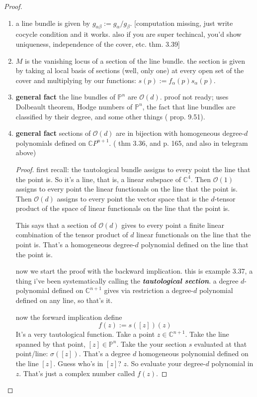 \begin{proof}
\begin{enumerate}[label=\textbf{Step \arabic*}]
\item a line bundle is given by \(g_{\alpha\beta}:=g_\alpha/g_\beta\). [computation missing, just write cocycle condition and it works. also if you are super techincal, you'd show uniqueness, independence of the cover, etc. \cite{lec} thm. 3.39]
\item \(M\) is the vanishing locus of a section of the line bundle. the section is given by taking al local basis of sections (well, only one) at every open set of the cover and multiplying by our functions: \(s(p):=f_\alpha(p)s_\alpha(p)\).
\item \textbf{general fact} the line bundles of \(\mathbb{P}^n\) are \(\mathcal{O}(d)\). proof not ready; uses Dolbeault theorem, Hodge numbers of \(\mathbb{P}^n\), the fact that line bundles are classified by their degree, and some other things (\cite{lec} prop. 9.51).
\item \textbf{general fact} sections of \(\mathcal{O}(d)\) are in bijection with homogeneous degree-\(d\) polynomials defined on \(\mathbb{C}P^{n+1}\). (\cite{lec} thm 3.36, and \cite{gri} p. 165, and also in telegram above)
	\begin{proof}\leavevmode
first recall: the tautological bundle assigns to every point the line that the point is. So it's a line, that is, a linear subspace of \(\mathbb{C}^4\). Then \(\mathcal{O}(1)\) assigns to every point the linear functionals on the line that the point is. Then \(\mathcal{O}(d)\) assigns to every point the vector space that is the \(d\)-tensor product of the space of linear functionals on the line that the point is.

This says that a section of \(\mathcal{O}(d)\) gives to every point a finite linear combination of the tensor product of \(d\) linear functionals on the line that the point is. That's a homogeneous degree-\(d\) polynomial defined on the line that the point is.

now we start the proof with the backward implication. this is \cite{lec} example 3.37, a thing i've been systematically calling the \textit{\textbf{tautological section}}. a degree \(d\)-polynomial defined on \(\mathbb{C}^{n+1}\) gives via restriction a degree-\(d\) polynomial defined on any line, so that's it.

now the forward implication  define\[f(z):=s([z])(z)\]It's a very tautological function. Take a point \(z \in \mathbb{C}^{n+1}\). Take the line spanned by that point, \([z] \in \mathbb{P}^n\). Take the your section \(s\) evaluated at that point/line: \(\sigma([z])\). That's a degree \(d\) homogeneous polynomial defined on the line \([z]\). Guess who's in \([z]\)? \(z\). So evaluate your degree-\(d\) polynomial in \(z\). That's just a complex number called \(f(z)\).


\end{proof}
\end{enumerate}
\end{proof}
